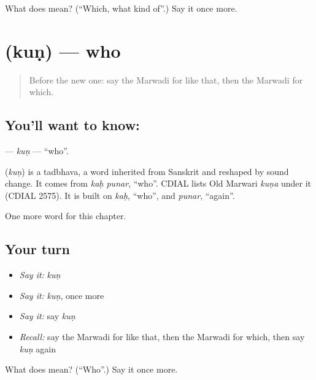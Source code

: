 \begin{tcolorbox}[breakable,colback=teal!4,colframe=teal!35!black,title={Before you move on}]
What does  mean? (\textquotedblleft{}Which, what kind of\textquotedblright{}.) Say it once more.
\end{tcolorbox}
\section[\texorpdfstring{\mw{कुण} (kuṇ)}{कुण (kuṇ)}]{ (kuṇ) — who}

\label{lesson:MW-C101-kun}



\begin{quote}
Before the new one: say the Marwadi for like that, then the Marwadi for which.
\end{quote}

\subsection*{You'll want to know: }
\textbf{} — \emph{kuṇ} — \textquotedblleft{}who\textquotedblright{}.

\begin{cousinweb}
\textbf{} (\emph{kuṇ}) is a tadbhava, a word inherited from Sanskrit and reshaped by sound change. It comes from \emph{kaḥ punar}, \textquotedblleft{}who\textquotedblright{}. CDIAL lists Old Marwari \emph{kuṇa} under it (CDIAL 2575). It is built on \emph{kaḥ}, \textquotedblleft{}who\textquotedblright{}, and \emph{punar}, \textquotedblleft{}again\textquotedblright{}.
\end{cousinweb}

\begin{grammarlens}[title={What you've built}]
One more word for this chapter.
\end{grammarlens}

\subsection*{Your turn}
\begin{itemize}
\raggedright
  \item \emph{Say it:} \emph{kuṇ}
  \item \emph{Say it:} \emph{kuṇ}, once more
  \item \emph{Say it:} say \emph{kuṇ}
  \item \emph{Recall:} say the Marwadi for like that, then the Marwadi for which, then say \emph{kuṇ} again
\end{itemize}

\begin{tcolorbox}[breakable,colback=teal!4,colframe=teal!35!black,title={Before you move on}]
What does  mean? (\textquotedblleft{}Who\textquotedblright{}.) Say it once more.
\end{tcolorbox}
